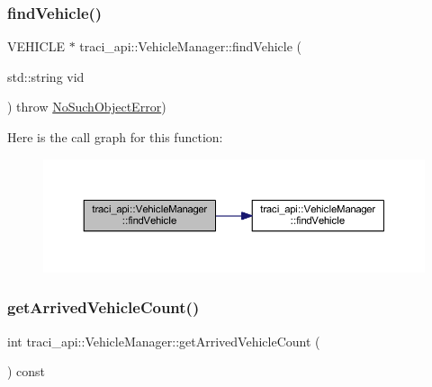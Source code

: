 \subsubsection{\texorpdfstring{find\+Vehicle()}{findVehicle()}\hspace{0.1cm}{\footnotesize\ttfamily [2/2]}}
{\footnotesize\ttfamily V\+E\+H\+I\+C\+LE $\ast$ traci\+\_\+api\+::\+Vehicle\+Manager\+::find\+Vehicle (\begin{DoxyParamCaption}\item[{std\+::string}]{vid }\end{DoxyParamCaption}) throw  \hyperlink{classtraci__api_1_1_no_such_object_error}{No\+Such\+Object\+Error}) }

Here is the call graph for this function\+:\nopagebreak
\begin{figure}[H]
\begin{center}
\leavevmode
\includegraphics[width=350pt]{classtraci__api_1_1_vehicle_manager_a4fc72da33abd7a0323fd27c7721ba3ef_cgraph}
\end{center}
\end{figure}
\mbox{\label{classtraci__api_1_1_vehicle_manager_a193c8fa0b8778c496b23fc114653ebfa}} 
\subsubsection{\texorpdfstring{get\+Arrived\+Vehicle\+Count()}{getArrivedVehicleCount()}}
{\footnotesize\ttfamily int traci\+\_\+api\+::\+Vehicle\+Manager\+::get\+Arrived\+Vehicle\+Count (\begin{DoxyParamCaption}{ }\end{DoxyParamCaption}) const}

